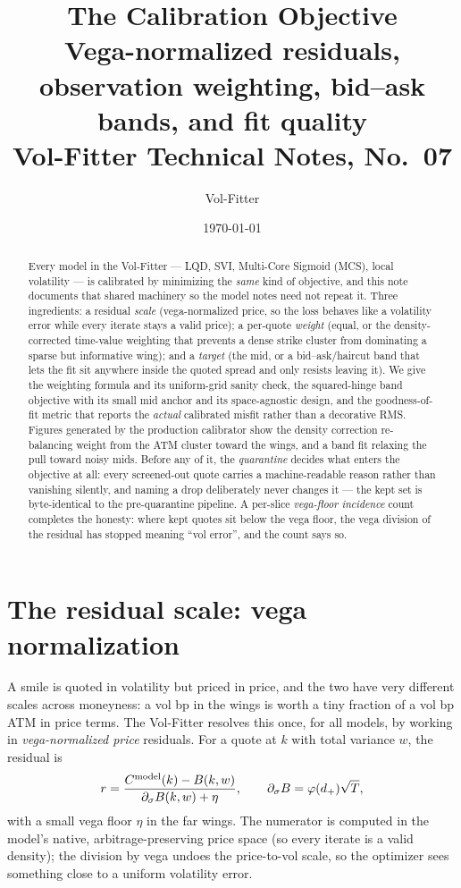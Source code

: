 \documentclass[11pt]{article}
\title{\textbf{The Calibration Objective}\\[2pt]
\large Vega-normalized residuals, observation weighting, bid--ask bands, and fit quality\\[2pt]
\normalsize Vol-Fitter Technical Notes, No.~07}
\author{Vol-Fitter}
\date{\today}
\begin{document}
\maketitle


\begin{abstract}
Every model in the Vol-Fitter --- LQD, SVI, Multi-Core Sigmoid (MCS), local volatility ---
is calibrated by minimizing the \emph{same} kind of objective, and this note
documents that shared machinery so the model notes need not repeat it. Three
ingredients: a residual \emph{scale} (vega-normalized price, so the loss behaves
like a volatility error while every iterate stays a valid price); a per-quote
\emph{weight} (equal, or the density-corrected time-value weighting that prevents
a dense strike cluster from dominating a sparse but informative wing); and a
\emph{target} (the mid, or a bid--ask/haircut band that lets the fit sit anywhere
inside the quoted spread and only resists leaving it). We give the weighting
formula and its uniform-grid sanity check, the squared-hinge band objective with
its small mid anchor and its space-agnostic design, and the goodness-of-fit
metric that reports the \emph{actual} calibrated misfit rather than a decorative
RMS. Figures generated by the production calibrator show the density correction
re-balancing weight from the ATM cluster toward the wings, and a band fit relaxing
the pull toward noisy mids. Before any of it, the \emph{quarantine} decides
what enters the objective at all: every screened-out quote carries a
machine-readable reason rather than vanishing silently, and naming a drop
deliberately never changes it --- the kept set is byte-identical to the
pre-quarantine pipeline. A per-slice \emph{vega-floor incidence} count
completes the honesty: where kept quotes sit below the vega floor, the
vega division of the residual has stopped meaning ``vol error'', and the
count says so.
\end{abstract}

\tableofcontents
\newpage

\section{The residual scale: vega normalization}
\label{sec:vega}

A smile is quoted in volatility but priced in price, and the two have very
different scales across moneyness: a vol bp in the wings is worth a tiny fraction
of a vol bp ATM in price terms. The Vol-Fitter resolves this once, for all models,
by working in \emph{vega-normalized price} residuals. For a quote at $k$ with
total variance $w$, the residual is
\begin{equation}
r=\frac{C^{\text{model}}(k)-B(k,w)}{\partial_\sigma B(k,w)+\eta},
\qquad \partial_\sigma B=\varphi(d_+)\sqrt T,
\label{eq:vega}
\end{equation}
with a small vega floor $\eta$ in the far wings. The numerator is computed in the
model's native, arbitrage-preserving price space (so every iterate is a valid
density); the division by vega undoes the price-to-vol scale, so the optimizer
sees something close to a uniform volatility error.
\end{document}
